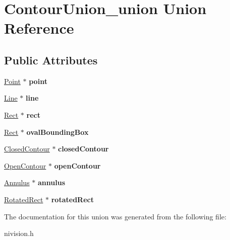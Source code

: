 \hypertarget{unionContourUnion__union}{
\section{ContourUnion\_\-union Union Reference}
\label{unionContourUnion__union}
}
\subsection*{Public Attributes}
\begin{DoxyCompactItemize}
\item 
\hypertarget{unionContourUnion__union_ae6caaf952005075a2e2b62efb7d830f0}{
\hyperlink{structPoint__struct}{Point} $\ast$ {\bfseries point}}
\label{unionContourUnion__union_ae6caaf952005075a2e2b62efb7d830f0}

\item 
\hypertarget{unionContourUnion__union_a7bbcb07a555bcb91ee1e35632590520a}{
\hyperlink{structLine__struct}{Line} $\ast$ {\bfseries line}}
\label{unionContourUnion__union_a7bbcb07a555bcb91ee1e35632590520a}

\item 
\hypertarget{unionContourUnion__union_a3a16e0e2281a6c1b145bb57ab2e69b6e}{
\hyperlink{structRect__struct}{Rect} $\ast$ {\bfseries rect}}
\label{unionContourUnion__union_a3a16e0e2281a6c1b145bb57ab2e69b6e}

\item 
\hypertarget{unionContourUnion__union_a5f11bb31b642ac368503ca40f5022a1a}{
\hyperlink{structRect__struct}{Rect} $\ast$ {\bfseries ovalBoundingBox}}
\label{unionContourUnion__union_a5f11bb31b642ac368503ca40f5022a1a}

\item 
\hypertarget{unionContourUnion__union_a85ee19e39ea6f7996591d51415a0db6a}{
\hyperlink{structClosedContour__struct}{ClosedContour} $\ast$ {\bfseries closedContour}}
\label{unionContourUnion__union_a85ee19e39ea6f7996591d51415a0db6a}

\item 
\hypertarget{unionContourUnion__union_adab99e6f29795a80af3ff41a2da1be55}{
\hyperlink{structOpenContour__struct}{OpenContour} $\ast$ {\bfseries openContour}}
\label{unionContourUnion__union_adab99e6f29795a80af3ff41a2da1be55}

\item 
\hypertarget{unionContourUnion__union_a87286bde824ee75d5134464084042d8e}{
\hyperlink{structAnnulus__struct}{Annulus} $\ast$ {\bfseries annulus}}
\label{unionContourUnion__union_a87286bde824ee75d5134464084042d8e}

\item 
\hypertarget{unionContourUnion__union_ab3b4c430a02019466e8e173f1e904bed}{
\hyperlink{structRotatedRect__struct}{RotatedRect} $\ast$ {\bfseries rotatedRect}}
\label{unionContourUnion__union_ab3b4c430a02019466e8e173f1e904bed}

\end{DoxyCompactItemize}


The documentation for this union was generated from the following file:\begin{DoxyCompactItemize}
\item 
nivision.h\end{DoxyCompactItemize}

